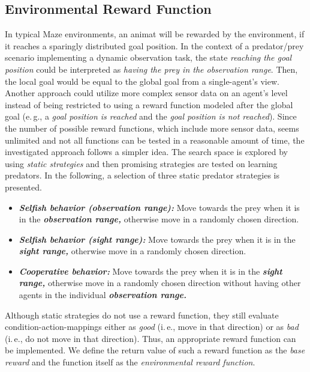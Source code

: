 \subsection{Environmental Reward Function}
\label{subsection:environment-reward-function}

In typical Maze environments, an animat will be rewarded by the environment, if it reaches a sparingly distributed goal position. In the context of a predator/prey scenario implementing a dynamic observation task, the state \emph{reaching the goal position} could be interpreted as \emph{having the prey in the observation range}. Then, the local goal would be equal to the global goal from a single-agent's view. Another approach could utilize more complex sensor data on an agent's level instead of being restricted to using a reward function modeled after the global goal (e.\,g., a \emph{goal position is reached} and the \emph{goal position is not reached}). Since the number of possible reward functions, which include more sensor data, seems unlimited and not all functions can be tested in a reasonable amount of time, the investigated approach follows a simpler idea. The search space is explored by using \emph{static strategies} and then promising strategies are tested on learning predators. In the following, a selection of three static predator strategies is presented. 


\begin{itemize}
	\item \emph{\textbf{Selfish behavior (observation range):}} Move towards the prey when it is in the \emph{\textbf{observation range,}} otherwise move in a randomly chosen direction.
	\item \emph{\textbf{Selfish behavior (sight range):}} Move towards the prey when it is in the \emph{\textbf{sight range,}} otherwise move in a randomly chosen direction.
	\item \emph{\textbf{Cooperative behavior:}} Move towards the prey when it is in the \emph{\textbf{sight range,}} otherwise move in a randomly chosen direction without having other agents in the individual \emph{\textbf{observation range.}}
\end{itemize}

Although static strategies do not use a reward function, they still evaluate condition-action-mappings either as \emph{good} (i.\,e., move in that direction) or as \emph{bad} (i.\,e., do not move in that direction). Thus, an appropriate reward function can be implemented. We define the return value of such a reward function as the \emph{base reward} and the function itself as the \emph{environmental reward function}.

